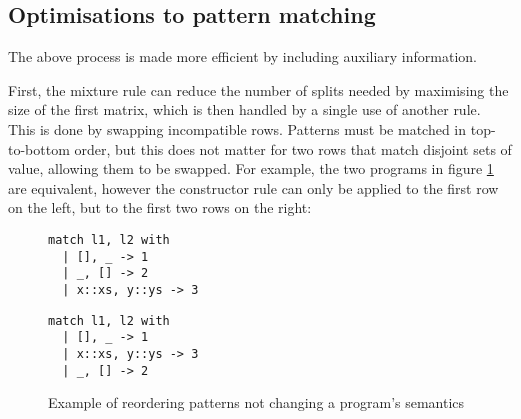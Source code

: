 


\subsection{Optimisations to pattern matching}
The above process is made more efficient by including auxiliary information. %


First, the mixture rule can reduce the number of splits needed by maximising the size of the first matrix, which is then handled by a single use of another rule. This is done by swapping incompatible rows. Patterns must be matched in top-to-bottom order, but this does not matter for two rows that match disjoint sets of value, allowing them to be swapped. For example, the two programs in figure \ref{fig:rowswap} are equivalent, however the constructor rule can only be applied to the first row on the left, but to the first two rows on the right:

\begin{figure}[H]
\hfill
\begin{minipage}{0.45\textwidth}
\begin{verbatim}
match l1, l2 with
  | [], _ -> 1
  | _, [] -> 2
  | x::xs, y::ys -> 3
\end{verbatim}
\end{minipage}\qquad
\begin{minipage}{0.45\textwidth}
\begin{verbatim}
match l1, l2 with
  | [], _ -> 1
  | x::xs, y::ys -> 3
  | _, [] -> 2
\end{verbatim}
\end{minipage}\hfill
\caption{Example of reordering patterns not changing a program's semantics}
\label{fig:rowswap}
\end{figure}

